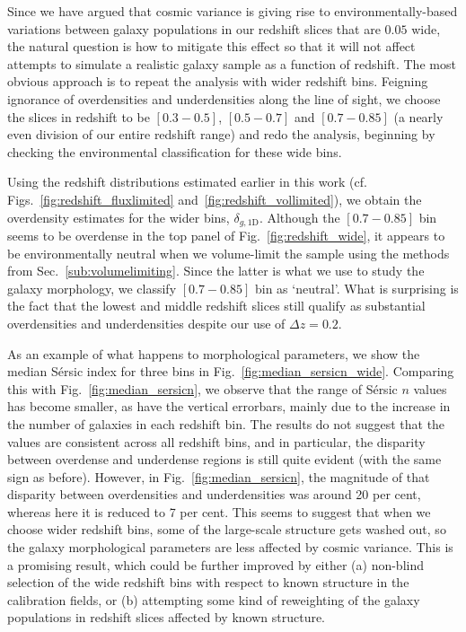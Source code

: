 \documentclass[twocolumn,useAMS,usenatbib]{mn2e}
\newcommand{\sersic}{S\'{e}rsic }
\begin{document}
Since we have argued that cosmic variance is giving rise to
environmentally-based variations between galaxy populations in our
redshift slices that are $0.05$ wide, the natural question is how to
mitigate this effect so that it will not affect attempts to simulate a
realistic galaxy sample as a function of redshift.  The most obvious
approach is to repeat the analysis with wider redshift bins. Feigning ignorance of overdensities and underdensities along the line of sight, we choose the slices in redshift to be $\left[ 0.3 - 0.5 \right]$,
$\left[ 0.5 - 0.7\right]$ and $\left[ 0.7 - 0.85\right]$ (a nearly
even division of our entire redshift range) and redo the analysis,
beginning by checking the environmental classification for these wide bins.

Using the redshift distributions estimated earlier in this work (cf. Figs.~\ref{fig:redshift_fluxlimited}
and~\ref{fig:redshift_vollimited}), we obtain the overdensity estimates for
the wider bins, $\delta_{g,\text{1D}}$.
Although the $\left[ 0.7 - 0.85\right]$ bin seems to be overdense in
the top panel of Fig.~\ref{fig:redshift_wide}, it appears to be
environmentally neutral when we volume-limit the sample 
using the methods from Sec.~\ref{sub:volumelimiting}.
Since the latter is what we use to study the galaxy morphology, we
classify $\left[ 0.7 - 0.85\right]$ bin as `neutral'.
What is surprising is the fact that the lowest and middle redshift
slices still qualify as substantial overdensities and underdensities
despite our use of $\Delta z=0.2$.

As an example of what happens to morphological parameters, we show the
median \sersic index for three bins in
Fig.~\ref{fig:median_sersicn_wide}.  Comparing this with
Fig.~\ref{fig:median_sersicn}, we observe that the 
range of \sersic $n$ values has become smaller, as have the vertical errorbars, mainly due to the increase in the number of galaxies in each redshift bin. The results do not suggest that the values
are consistent across all redshift bins, and in particular, the
disparity between overdense and underdense regions is still quite
evident (with the same sign as before). However, in
Fig.~\ref{fig:median_sersicn}, the magnitude of that disparity between
overdensities and underdensities was around 20 per cent, whereas here
it is reduced to 7 per cent.  This seems to suggest that when we
choose wider redshift bins, some of the large-scale structure gets washed out, 
so the galaxy morphological parameters are less affected by cosmic
variance.  This is a promising result, which could be further improved
by either (a) non-blind selection of the wide redshift bins with respect to
known structure in the calibration fields, or (b) attempting some kind of
reweighting of the galaxy populations in redshift slices affected by
known structure.
\end{document}
